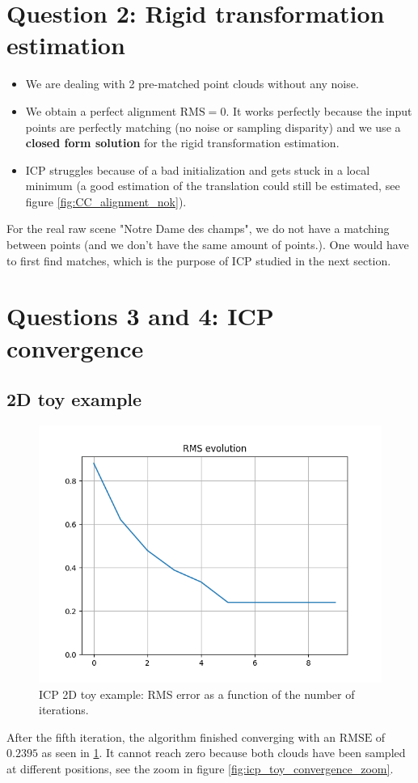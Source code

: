 \documentclass[a4paper]{article}
\begin{document}
\pagebreak

\section*{Question 2: Rigid transformation estimation}
\begin{itemize}
  \item We are dealing with 2 pre-matched point clouds without any noise.
  \item We obtain a perfect alignment $\text{RMS} = 0$.
It works perfectly because the input points are perfectly matching (no noise or sampling disparity) and we use a \textbf{closed form solution} for the rigid transformation estimation.
  \item ICP struggles because of a bad initialization and gets stuck in a local minimum (a good estimation of the translation could still be estimated, see figure \ref{fig:CC_alignment_nok}).
\end{itemize}


For the real raw scene "Notre Dame des champs", we do not have a matching between points (and we don't have the same amount of points.). One would have to first find matches, which is the purpose of ICP studied in the next section.

\pagebreak
\section*{Questions 3 and 4: ICP convergence}
\subsection*{2D toy example}
\begin{figure}[ht]
  \centering
  \includegraphics[width=0.4\linewidth]{figures/icp_2d_toy_example.png}
  \caption{ICP 2D toy example:  RMS error as a function of the number of iterations.}
  \label{fig:icp_toy_convergence}
\end{figure}


After the fifth iteration, the algorithm finished converging with an $\text{RMSE}$ of $0.2395$ as seen in \ref{fig:icp_toy_convergence}. It cannot reach zero because both clouds have been sampled at different positions, see the zoom in figure \ref{fig:icp_toy_convergence_zoom}.
\end{document}
